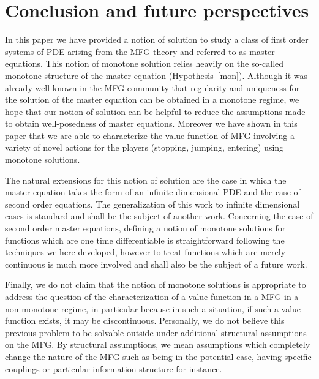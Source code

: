 \documentclass[10pt]{amsart}
\theoremstyle{definition}
\begin{document}
\section{Conclusion and future perspectives}\label{sec:6}
In this paper we have provided a notion of solution to study a class of first order systems of PDE arising from the MFG theory and referred to as master equations. This notion of monotone solution relies heavily on the so-called monotone structure of the master equation (Hypothesis~\ref{mon}). Although it was already well known in the MFG community that regularity and uniqueness for the solution of the master equation can be obtained in a monotone regime, we hope that our notion of solution can be helpful to reduce the assumptions made to obtain well-posedness of master equations. Moreover we have shown in this paper that we are able to characterize the value function of MFG involving a variety of novel actions for the players (stopping, jumping, entering) using monotone solutions.

The natural extensions for this notion of solution are the case in which the master equation takes the form of an infinite dimensional PDE and the case of second order equations. The generalization of this work to infinite dimensional cases is standard and shall be the subject of another work. Concerning the case of second order master equations, defining a notion of monotone solutions for functions which are one time differentiable is straightforward following the techniques we here developed, however to treat functions which are merely continuous is much more involved and shall also be the subject of a future work.

Finally, we do not claim that the notion of monotone solutions is appropriate to address the question of the characterization of a value function in a MFG in a non-monotone regime, in particular because in such a situation, if such a value function exists, it may be discontinuous. Personally, we do not believe this previous problem to be solvable outside under additional structural assumptions on the MFG. By structural assumptions, we mean assumptions which completely change the nature of the MFG such as being in the potential case, having specific couplings or particular information structure for instance.

\appendix
\end{document}
